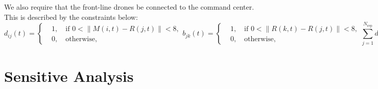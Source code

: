 \documentclass[13pt]{ctexart} %
\begin{document}
We also require that the front-line drones be connected to the command center. This is described by the constraints below:
\begin{subequations}
    \begin{equation}
        d_{ij}(t)=\left\{
        \begin{aligned}
             & 1, \quad \text{if } 0< \lVert M(i,t)-R(j,t)\rVert< 8, \\
             & 0,\quad \text{otherwise},
        \end{aligned}
        \right.
    \end{equation}
    \begin{equation}
        b_{jk}(t)=\left\{
        \begin{aligned}
             & 1, \quad \text{if } 0< \lVert R(k,t)-R(j,t)\rVert< 8, \\
             & 0,\quad \text{otherwise},
        \end{aligned}
        \right.
    \end{equation}
    \begin{equation}
        \sum_{j=1}^{N_{\text{rep}}}d_{ij}\geq 1, \quad i=1,2,\cdots,N_{\text{SSA}}
    \end{equation}
    \begin{equation}
        \sum_{k=1}^{N_{\text{rep}}}b_{jk}\left\{
        \begin{aligned}
            \geq 1, & \qquad \text{if }\sum_{i=1}^{N_{\text{SSA}}} d_{ij}\geq 1, \\
            \geq 2, & \qquad \text{otherwise},
        \end{aligned}
        \right.
    \end{equation}
\end{subequations}

\section{Sensitive Analysis}
\end{document}
